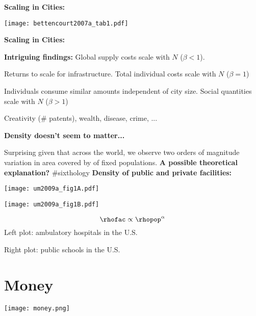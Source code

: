 \textbf{Scaling in Cities:}

\begin{marginfigure}[]
  \texttt{[image: bettencourt2007a\_tab1.pdf]}
\end{marginfigure}

\textbf{Scaling in Cities:}

\textbf{Intriguing findings:}
Global supply costs scale  with $N$ ($\beta<1$).

Returns to scale for infrastructure.
Total individual costs scale  with $N$ ($\beta=1$)

Individuals consume similar amounts independent of city size.
Social quantities scale  with $N$ ($\beta>1$)

Creativity (\# patents), wealth, disease, crime, ...


\medskip

\textbf{Density doesn't seem to matter...}

Surprising given that across the world,
we observe two orders of magnitude variation
in area covered by
of fixed populations.
\textbf{A possible theoretical explanation?}
\bigskip
\#sixthology
\textbf{Density of public and private facilities:}

\begin{marginfigure}[]
  \texttt{[image: um2009a\_fig1A.pdf]}
\end{marginfigure}


\begin{marginfigure}[]
  \texttt{[image: um2009a\_fig1B.pdf]}
\end{marginfigure}

$$
\rhofac \propto \rhopop^{\alpha} 
$$    
\alert{Left plot:} ambulatory hospitals in the U.S.

\alert{Right plot:} public schools in the U.S.
\section{Money}



\begin{marginfigure}[]
  \texttt{[image: money.png]}
\end{marginfigure}


